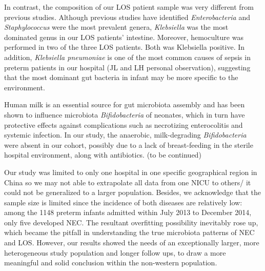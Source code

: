 \documentclass[fleqn,10pt]{wlpeerj} %
\begin{document}
In contrast, the composition of our LOS patient sample was very different from previous studies.  Although previous studies have identified \textit{Enterobacteria} and \textit{Staphylococcus} were the most prevalent genera\citep{Stewart2017Longitudinal, mai2013distortions}, \textit{Klebsiella} was the most dominated genus in our LOS patients’ intestine. Moreover, hemoculture was performed in two of the three LOS patients. Both was Klebsiella positive. In addition, \textit{Klebsiella pneumoniae} is one of the most common causes of sepsis in preterm patients in our hospital (JL and LH personal observation), suggesting that the most dominant gut bacteria in infant may be more specific to the environment.

Human milk is an essential source for gut microbiota assembly and has been shown to influence microbiota \textit{Bifidobacteria} of neonates, which in turn have protective effects against complications such as necrotizing enterocolitis and systemic infection\citep{nakayama2003intestinal, khodayar2014impact, hermansson2019breast}. In our study, the anaerobic, milk-degrading \textit{Bifidobacteria} were absent in our cohort, possibly due to a lack of breast-feeding in the sterile hospital environment, along with antibiotics. (to be continued)









Our study was limited to only one hospital in one specific geographical region in China so we may not able to extrapolate all data from one NICU to others/ it could not be generalized to a larger population. Besides, we acknowledge that the sample size is limited since the incidence of both diseases are relatively low: among the 1148 preterm infants admitted within July 2013 to December 2014, only five developed NEC. The resultant overfitting possibility inevitably rose up, which became the pitfall in understanding the true microbiota patterns of NEC and LOS. However, our results showed the needs of an exceptionally larger, more heterogeneous study population and longer follow ups, to draw a more meaningful and solid conclusion within the non-western population.
\end{document}

